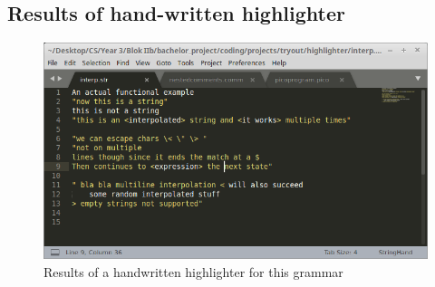 \subsection{Results of hand-written highlighter}
\begin{figure}[h!]
	\centering
	\includegraphics[width=\textwidth, keepaspectratio]{Figures/highlightShots/string_handwritten.png}
	\decoRule
 	\caption[Hand-written highlighter results for StringInterpolation grammar]{Results of a handwritten highlighter for this grammar}
 	\label{fig:stringInterp:highlighter:written}
\end{figure}